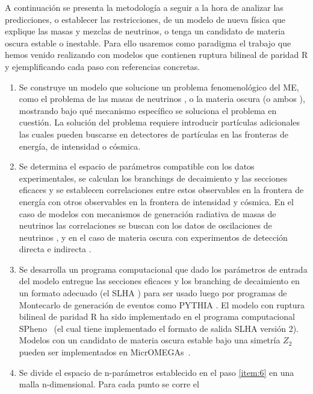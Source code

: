 A continuación se presenta la metodología a seguir a la hora de
analizar las predicciones, o establecer las restricciones, de un
modelo de nueva física que explique las masas y mezclas de neutrinos,
o tenga un candidato de materia oscura estable o inestable. Para
ello usaremos como paradigma el trabajo que hemos venido realizando
con modelos que contienen ruptura bilineal de paridad R y ejemplificando cada
paso con referencias concretas.
\begin{enumerate}
\item Se construye un modelo que solucione un problema fenomenológico
  del ME, como el problema de las masas de neutrinos
  \cite{Hirsch:2000ef}, o la materia oscura (o ambos
  \cite{Hirsch:2005ag,Restrepo:2011rj}), mostrando bajo qué mecanismo
  específico se soluciona el problema en cuestión. La solución del
  problema requiere introducir partículas adicionales las cuales
  pueden buscarse en detectores de partículas en las fronteras de
  energía, de intensidad o cósmica.
  \label{item:5}
\item Se determina el espacio de parámetros compatible con los datos
  experimentales, se calculan los branchings de decaimiento y las
  secciones eficaces y se establecen correlaciones entre estos
  observables en la frontera de energía con otros observables en la
  frontera de intensidad y cósmica. En el caso de modelos con
  mecanismos de generación radiativa de masas de neutrinos las
  correlaciones se buscan con los datos de oscilaciones de neutrinos
  \cite{Diaz:2003as}, y en el caso de materia oscura con experimentos
  de detección directa e indirecta \cite{Choi:2010xn,Restrepo:2011rj}.
  \label{item:6}
\item Se desarrolla un programa computacional que dado los parámetros
  de entrada del modelo entregue las secciones eficaces y los
  branching de decaimiento en un formato adecuado (el SLHA
  \cite{Allanach:2008qq}) para ser usado luego por programas de Montecarlo
  de generación de eventos como PYTHIA \cite{Sjostrand:2006za}. El
  modelo con ruptura bilineal de paridad R ha sido implementado en el
  programa computacional SPheno~\cite{Porod:2003um} (el cual tiene
  implementado el formato de salida SLHA versión 2). Modelos con un
  candidato de materia oscura estable bajo una simetría $Z_2$ pueden
  ser implementados en MicrOMEGAs~\cite{Belanger:2006is}.
  \label{item:7}
\item Se divide el espacio de n-parámetros establecido en el paso
  \ref{item:6} en una malla n-dimensional. Para cada punto se corre el

\end{enumerate}

